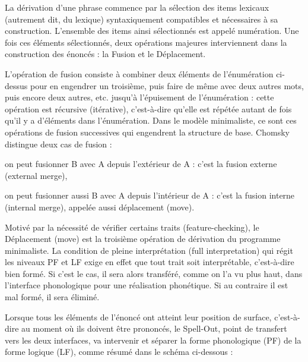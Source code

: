 La dérivation d’une phrase commence par la sélection des items lexicaux (autrement dit, du lexique) syntaxiquement compatibles et nécessaires à sa construction. L’ensemble des items ainsi sélectionnés est appelé numération. Une fois ces éléments sélectionnés, deux opérations majeures interviennent dans la construction des énoncés : la Fusion et le Déplacement.\par

L'opération de fusion consiste à combiner deux éléments de l’énumération ci-dessus pour en engendrer un troisième, puis faire de même avec deux autres mots, puis encore deux autres, etc. jusqu’à l’épuisement de l’énumération : cette opération est récursive (itérative), c’est-à-dire qu’elle est répétée autant de fois qu’il y a d’éléments dans l’énumération. Dans le modèle minimaliste, ce sont ces opérations de fusion successives qui engendrent la structure de base. Chomsky distingue deux cas de fusion :\par




on peut fusionner B avec A depuis l'extérieur de A : c’est la fusion externe (external merge),\par

on peut fusionner aussi B avec A depuis l’intérieur de A : c’est la fusion interne (internal merge), appelée aussi déplacement (move).\par


Motivé par la nécessité de vérifier certains traits (feature-checking), le Déplacement (move) est la troisième opération de dérivation du programme minimaliste. La condition de pleine interprétation (full interpretation) qui régit les niveaux PF et LF exige en effet que tout trait soit interprétable, c’est-à-dire bien formé. Si c’est le cas, il sera alors transféré, comme on l’a vu plus haut, dans l’interface phonologique pour une réalisation phonétique. Si au contraire il est mal formé, il sera éliminé.\par


Lorsque tous les éléments de l’énoncé ont atteint leur position de surface, c’est-à-dire au moment où ils doivent être prononcés, le Spell-Out, point de transfert vers les deux interfaces, va intervenir et séparer la forme phonologique (PF) de la forme logique (LF), comme résumé dans le schéma ci-dessous :\par

